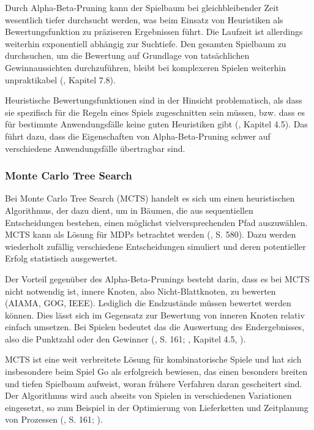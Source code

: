 Durch Alpha-Beta-Pruning kann der Spielbaum bei gleichbleibender Zeit wesentlich tiefer durchsucht werden, was beim Einsatz von Heuristiken als Bewertungsfunktion zu präziseren Ergebnissen führt. Die Laufzeit ist allerdings weiterhin exponentiell abhängig zur Suchtiefe. Den gesamten Spielbaum zu durchsuchen, um die Bewertung auf Grundlage von tatsächlichen Gewinnaussichten durchzuführen, bleibt bei komplexeren Spielen weiterhin unpraktikabel (\cite{Heineman.October2008}, Kapitel 7.8).

Heuristische Bewertungsfunktionen sind in der Hinsicht problematisch, als dass sie spezifisch für die Regeln eines Spiels zugeschnitten sein müssen, bzw. dass es für bestimmte Anwendungsfälle keine guten Heuristiken gibt (\cite{Ferguson.January2019}, Kapitel 4.5). Das führt dazu, dass die Eigenschaften von Alpha-Beta-Pruning schwer auf verschiedene Anwendungsfälle übertragbar sind.

\subsubsection{Monte Carlo Tree Search}

Bei Monte Carlo Tree Search (MCTS) handelt es sich um einen heuristischen Algorithmus, der dazu dient, um in Bäumen, die aus sequentiellen Entscheidungen bestehen, einen möglichst vielversprechenden Pfad auszuwählen. MCTS kann als Lösung für MDPs betrachtet werden (\cite{Russell.2020}, S. 580). Dazu werden wiederholt zufällig verschiedene Entscheidungen simuliert und deren potentieller Erfolg statistisch ausgewertet.

Der Vorteil gegenüber des Alpha-Beta-Prunings besteht darin, dass es bei MCTS nicht notwendig ist, innere Knoten, also Nicht-Blattknoten, zu bewerten (AIAMA, GOG, IEEE). Lediglich die Endzustände müssen bewertet werden können. Dies lässt sich im Gegensatz zur Bewertung von inneren Knoten relativ einfach umsetzen. Bei Spielen bedeutet das die Auswertung des Endergebnisses, also die Punktzahl oder den Gewinner (\cite{Russell.2020}, S. 161; \cite{Ferguson.January2019}, Kapitel 4.5, \cite{Browne.2012}).

MCTS ist eine weit verbreitete Lösung für kombinatorische Spiele und hat sich insbesondere beim Spiel Go als erfolgreich bewiesen, das einen besonders breiten und tiefen Spielbaum aufweist, woran frühere Verfahren daran gescheitert sind. Der Algorithmus wird auch abseits von Spielen in verschiedenen Variationen eingesetzt, so zum Beispiel in der Optimierung von Lieferketten und Zeitplanung von Prozessen (\cite{Russell.2020}, S. 161; \cite{Browne.2012}).

